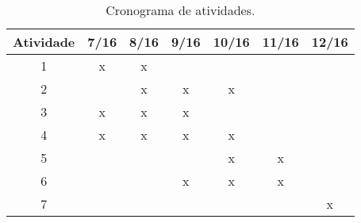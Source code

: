 \documentclass[11pt,a4paper]{article}
\begin{document}
\begin{table}[ht]
\begin{center}
	\caption{Cronograma de atividades. \label{tab:cronograma}}
		\begin{tabular}{|c|c|c|c|c|c|c|}
			\hline			
			 \bf Atividade & \bf 7/16 & \bf 8/16 & \bf 9/16 & \bf 10/16 & \bf 11/16 & \bf 12/16  \\	\hline \hline
					 1 & x & x &   &   &   &   \\ \hline
					 2 &   & x & x & x &   &   \\ \hline
					 3 & x & x & x &   &   &   \\ \hline
					 4 & x & x & x & x &   &   \\ \hline
					 5 &   &   &   & x & x &   \\ \hline
					 6 &   &   & x & x & x &   \\ \hline
					 7 &   &   &   &   &   & x \\ \hline
		\end{tabular}
		\end{center}		
\end{table}

\renewcommand\refname{Referências}
{\small


}
\end{document}
